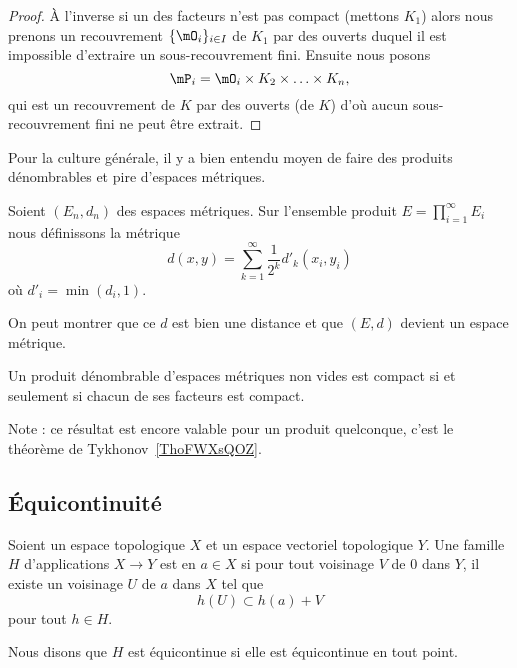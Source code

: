 \begin{proof}
	À l'inverse si un des facteurs n'est pas compact (mettons \( K_1\)) alors nous prenons un recouvrement \( \{ \mO_i \}_{i\in I}\) de \( K_1\) par des ouverts duquel il est impossible d'extraire un sous-recouvrement fini. Ensuite nous posons
	\begin{equation}
		\mP_i=\mO_i\times K_2\times\ldots\times K_n,
	\end{equation}
	qui est un recouvrement de \( K\) par des ouverts (de \( K\)) d'où aucun sous-recouvrement fini ne peut être extrait.
\end{proof}

Pour la culture générale, il y a bien entendu moyen de faire des produits dénombrables et pire d'espaces métriques.
\begin{definition}
	Soient \( (E_n,d_n)\) des espaces métriques. Sur l'ensemble produit \( E=\prod_{i=1}^{\infty}E_i\) nous définissons la métrique
	\begin{equation}
		d(x,y)=\sum_{k=1}^{\infty}\frac{1}{ 2^k }d'_k(x_i,y_i)
	\end{equation}
	où \( d'_i=\min(d_i,1)\).
\end{definition}
On peut montrer que ce \( d\) est bien une distance et que \( (E,d)\) devient un espace métrique.

\begin{theorem} \label{ThoKKBooNaZgoO}  %
	Un produit dénombrable d'espaces métriques non vides est compact si et seulement si chacun de ses facteurs est compact.
\end{theorem}
Note : ce résultat est encore valable pour un produit quelconque, c'est le théorème de Tykhonov~\ref{ThoFWXsQOZ}.

\subsection{Équicontinuité}

\begin{definition}        \label{DEFooDHQDooFfIvsX}
	Soient un espace topologique \( X\) et un espace vectoriel topologique \( Y\). Une famille \( H\) d'applications \( X\to Y\) est  en \( a\in X\) si pour tout voisinage \( V\) de \( 0\) dans \( Y\), il existe un voisinage \( U\) de \( a\) dans \( X\) tel que
	\begin{equation}
		h(U)\subset h(a)+V
	\end{equation}
	pour tout \( h\in H\).

	Nous disons que \( H\) est équicontinue si elle est équicontinue en tout point.
\end{definition}

